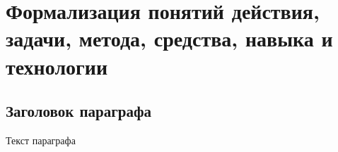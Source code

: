 
\chapter{Формализация понятий действия, задачи, метода, средства, навыка и технологии}
\label{chapter_actions}


\section{Заголовок параграфа}
Текст параграфа

%